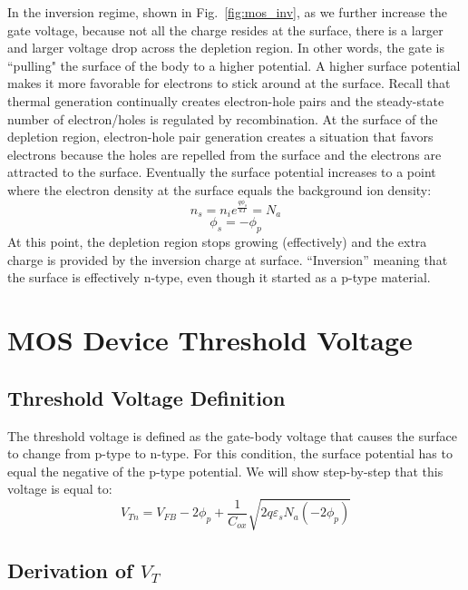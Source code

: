 In the inversion regime, shown in Fig.~\ref{fig:mos_inv}, as we further increase the gate voltage, because not all the charge resides at the surface, there is a larger and larger voltage drop across the depletion region.  In other words, the gate is ``pulling" the surface of the body to a higher potential.  A higher surface potential makes it more favorable for electrons to stick around at the surface.  Recall that thermal generation continually creates electron-hole pairs and the steady-state number of electron/holes is regulated by recombination.  At the surface of the depletion region, electron-hole pair generation creates a situation that favors electrons because the holes are repelled from the surface and the electrons are attracted to the surface.  Eventually the surface potential increases to a point where the electron density at the surface equals the background ion density:
%
\begin{equation}
{n_s} = {n_i}{e^{\frac{{q{\phi _s}}}{{kT}}}} = {N_a}
\end{equation}
%
\begin{equation}
{\phi _s} =  - {\phi _p}
\end{equation}
%
At this point, the depletion region stops growing (effectively) and the extra charge is provided by the inversion charge at surface.   “Inversion” meaning that the surface is effectively n-type, even though it started as a p-type material.  
 

\section{MOS Device Threshold Voltage}


\subsection{Threshold Voltage Definition}

The threshold voltage is defined as the gate-body voltage that causes the surface to change from p-type to n-type.   For this condition, the surface potential has to equal the negative of the p-type potential.  We will show step-by-step that this voltage is equal to:
\begin{equation}
	{V_{Tn}} = {V_{FB}} - 2{\phi _p} + \frac{1}{{{C_{ox}}}}\sqrt {2q{\varepsilon _s}{N_a}( - 2{\phi _p})} 
\end{equation}


\subsection{Derivation of $V_T$}

